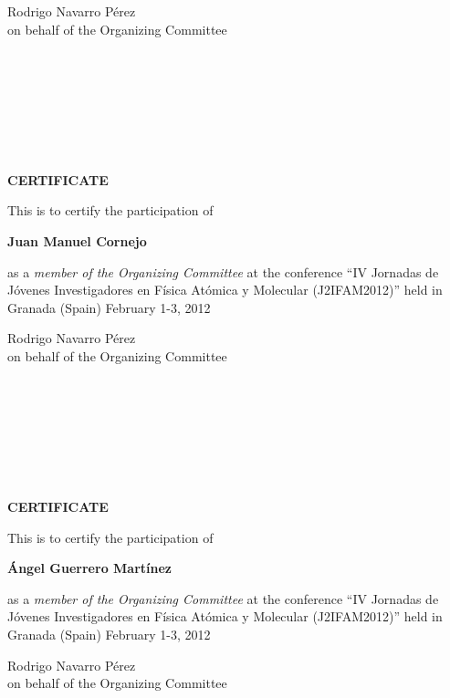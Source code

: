 \documentclass [13pt,a4paper] {letter}
\begin{document}
\vspace {4cm}
\begin{raggedleft}
Rodrigo Navarro Pérez\\
on behalf of the Organizing Committee
\newpage
\end{raggedleft}
\begin{verbatim}







\end{verbatim}
\pagestyle{empty}
\begin{center}
{\bf {\Huge CERTIFICATE}}

\vspace {1.5cm}
This is to certify the participation of
\vspace {1cm}

{\bf \Large  Juan  Manuel  Cornejo }
\vspace {1cm}

as a \emph{member of the Organizing Committee} at the conference { \textquotedblleft IV Jornadas de Jóvenes Investigadores en Física Atómica y Molecular (J2IFAM2012)\textquotedblright} 
held in Granada (Spain) February 1-3, 2012
\end{center}
\vspace {4cm}
\begin{raggedleft}
Rodrigo Navarro Pérez\\
on behalf of the Organizing Committee
\newpage
\end{raggedleft}
\begin{verbatim}







\end{verbatim}
\pagestyle{empty}
\begin{center}
{\bf {\Huge CERTIFICATE}}

\vspace {1.5cm}
This is to certify the participation of
\vspace {1cm}

{\bf \Large  Ángel    Guerrero Martínez }
\vspace {1cm}

as a \emph{member of the Organizing Committee} at the conference { \textquotedblleft IV Jornadas de Jóvenes Investigadores en Física Atómica y Molecular (J2IFAM2012)\textquotedblright} 
held in Granada (Spain) February 1-3, 2012
\end{center}
\vspace {4cm}
\begin{raggedleft}
Rodrigo Navarro Pérez\\
on behalf of the Organizing Committee
\newpage
\end{raggedleft}
\begin{verbatim}







\end{verbatim}
\end{document}
